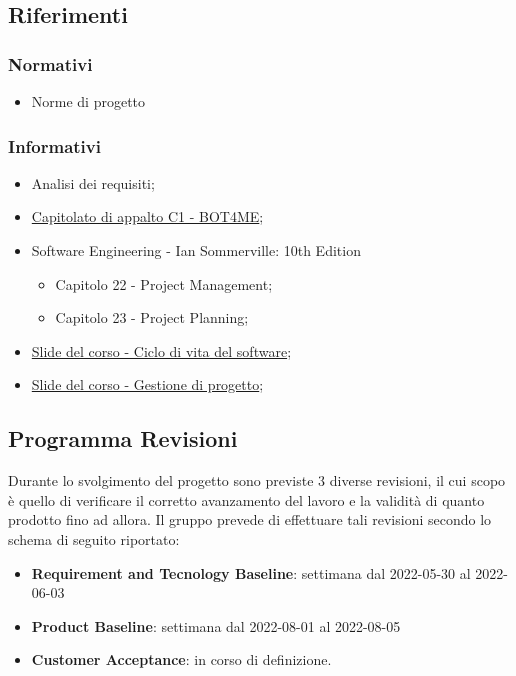 \subsection{Riferimenti}

\subsubsection{Normativi}
\begin{itemize}
    \item Norme di progetto
\end{itemize}

\subsubsection{Informativi}
\begin{itemize}
    \item Analisi dei requisiti;
    \item  \href{https://www.math.unipd.it/~tullio/IS-1/2021/Progetto/C1.pdf}{\color{blue} Capitolato di appalto C1 - BOT4ME};
    \item Software Engineering - Ian Sommerville: 10th Edition
    \begin{itemize}
        \item Capitolo 22 - Project Management;
        \item Capitolo 23 - Project Planning;
    \end{itemize}
    \item \href{https://www.math.unipd.it/~tullio/IS-1/2021/Dispense/T05.pdf}{\color{blue} Slide del corso - Ciclo di vita del software};
    \item \href{https://www.math.unipd.it/~tullio/IS-1/2021/Dispense/T06.pdf}{\color{blue} Slide del corso - Gestione di progetto};
\end{itemize}

\subsection{Programma Revisioni}
Durante lo svolgimento del progetto sono previste 3 diverse revisioni, il cui scopo è quello di verificare il corretto avanzamento del lavoro e la validità di quanto prodotto fino ad allora. 
Il gruppo prevede di effettuare tali revisioni secondo lo schema di seguito riportato: 
\begin{itemize}
    \item \textbf{Requirement and Tecnology Baseline}: settimana dal 2022-05-30 al 2022-06-03
    \item \textbf{Product Baseline}: settimana dal 2022-08-01 al 2022-08-05
    \item \textbf{Customer Acceptance}: in corso di definizione.
\end{itemize}
\newpage
